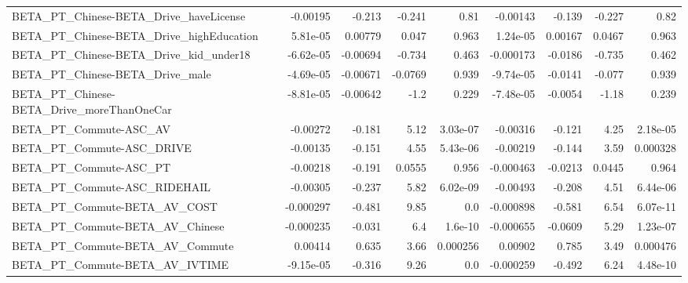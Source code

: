 \begin{tabular}{lrrrrrrrr}
BETA\_PT\_Chinese-BETA\_Drive\_haveLicense             &    -0.00195 &       -0.213 &   -0.241 &     0.81 &   -0.00143 &      -0.139 &       -0.227 &          0.82 \\
BETA\_PT\_Chinese-BETA\_Drive\_highEducation           &    5.81e-05 &      0.00779 &    0.047 &    0.963 &   1.24e-05 &     0.00167 &       0.0467 &         0.963 \\
BETA\_PT\_Chinese-BETA\_Drive\_kid\_under18             &   -6.62e-05 &     -0.00694 &   -0.734 &    0.463 &  -0.000173 &     -0.0186 &       -0.735 &         0.462 \\
BETA\_PT\_Chinese-BETA\_Drive\_male                    &   -4.69e-05 &     -0.00671 &  -0.0769 &    0.939 &  -9.74e-05 &     -0.0141 &       -0.077 &         0.939 \\
BETA\_PT\_Chinese-BETA\_Drive\_moreThanOneCar          &   -8.81e-05 &     -0.00642 &     -1.2 &    0.229 &  -7.48e-05 &     -0.0054 &        -1.18 &         0.239 \\
BETA\_PT\_Commute-ASC\_AV                             &    -0.00272 &       -0.181 &     5.12 & 3.03e-07 &   -0.00316 &      -0.121 &         4.25 &      2.18e-05 \\
BETA\_PT\_Commute-ASC\_DRIVE                          &    -0.00135 &       -0.151 &     4.55 & 5.43e-06 &   -0.00219 &      -0.144 &         3.59 &      0.000328 \\
BETA\_PT\_Commute-ASC\_PT                             &    -0.00218 &       -0.191 &   0.0555 &    0.956 &  -0.000463 &     -0.0213 &       0.0445 &         0.964 \\
BETA\_PT\_Commute-ASC\_RIDEHAIL                       &    -0.00305 &       -0.237 &     5.82 & 6.02e-09 &   -0.00493 &      -0.208 &         4.51 &      6.44e-06 \\
BETA\_PT\_Commute-BETA\_AV\_COST                       &   -0.000297 &       -0.481 &     9.85 &      0.0 &  -0.000898 &      -0.581 &         6.54 &      6.07e-11 \\
BETA\_PT\_Commute-BETA\_AV\_Chinese                    &   -0.000235 &       -0.031 &      6.4 &  1.6e-10 &  -0.000655 &     -0.0609 &         5.29 &      1.23e-07 \\
BETA\_PT\_Commute-BETA\_AV\_Commute                    &     0.00414 &        0.635 &     3.66 & 0.000256 &    0.00902 &       0.785 &         3.49 &      0.000476 \\
BETA\_PT\_Commute-BETA\_AV\_IVTIME                     &   -9.15e-05 &       -0.316 &     9.26 &      0.0 &  -0.000259 &      -0.492 &         6.24 &      4.48e-10 \\

\end{tabular}
